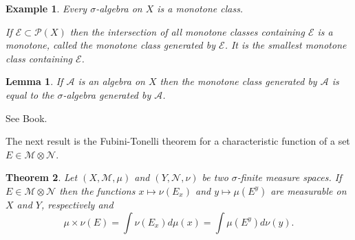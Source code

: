 \documentclass[12pt]{report}
\newtheorem{theorem}{Theorem}[section]
\newtheorem{lemma}[theorem]{Lemma}
\newtheorem{examp}{Example}[section]
\begin{document}
\begin{examp}  Every $\sigma$-algebra on $X$ is a monotone class.

\medskip
\noindent If $\mathcal{E} \subset \mathcal{P} (X)$ then the intersection
of all  monotone classes containing  $\mathcal{E}$ is a monotone, called
the monotone class generated by $\mathcal{E}$.  It is  the smallest
monotone class containing
$\mathcal{E}$.
\end{examp}

\begin{lemma}  If $\mathcal{A}$  is an algebra on
$X$ then the monotone class generated by $\mathcal{A}$  is equal to the
$\sigma$-algebra generated by $\mathcal{A}$.
\end{lemma}

  See Book.

\medskip
\noindent The next result is the Fubini-Tonelli theorem for a
characteristic  function of a set
$E \in \mathcal{M} \otimes \mathcal{N}$.

\begin{theorem}  Let $(X, \mathcal{M}, \mu)$ and $(Y,
\mathcal{N},
\nu)$ be two $\sigma$-finite measure spaces.  If $E \in \mathcal{M} 
\otimes
\mathcal{N}$ then the functions $x \longmapsto \nu(E_x)$ and $y 
\longmapsto
\mu(E^y)$ are measurable on $X$ and $Y$, respectively and 
\[
\mu \times \nu(E) = \int \nu(E_x) d\mu(x) = \int \mu(E^y) d \nu(y).
\]
\end{theorem}
\end{document}
